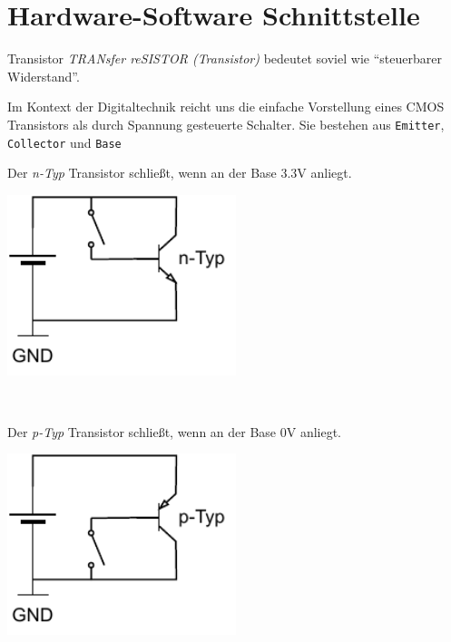 \section{Hardware-Software Schnittstelle}

\begin{defi}{Transistor}
    \emph{TRANsfer reSISTOR (Transistor)} bedeutet soviel wie \enquote{steuerbarer Widerstand}.

    Im Kontext der Digitaltechnik reicht uns die einfache Vorstellung eines CMOS Transistors als durch Spannung gesteuerte Schalter.
    Sie bestehen aus \texttt{Emitter}, \texttt{Collector} und \texttt{Base}

    \begin{minipage}[t]{0.45\textwidth}
        Der \emph{n-Typ} Transistor schließt, wenn an der Base 3.3V anliegt.

        \begin{center}
            \includegraphics[width=0.5\textwidth]{includes/figures/defi_npn.pdf}
        \end{center}
    \end{minipage}
    \begin{minipage}[t]{0.1\textwidth}
        \
    \end{minipage}
    \begin{minipage}[t]{0.45\textwidth}
        Der \emph{p-Typ} Transistor schließt, wenn an der Base 0V anliegt.

        \begin{center}
            \includegraphics[width=0.5\textwidth]{includes/figures/defi_pnp.pdf}
        \end{center}
    \end{minipage}
\end{defi}

